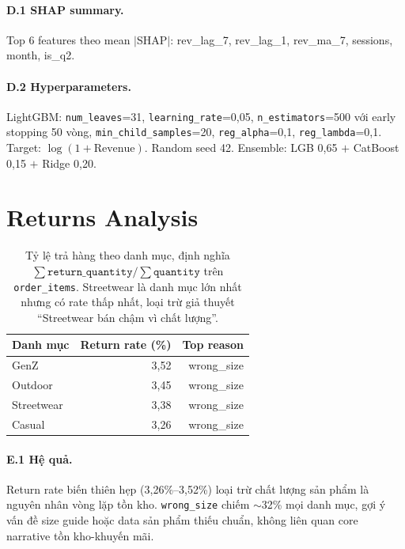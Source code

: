 \documentclass{article}
\begin{document}
\paragraph{D.1 SHAP summary.}
Top 6 features theo mean $|$SHAP$|$: rev\_lag\_7, rev\_lag\_1, rev\_ma\_7,
sessions, month, is\_q2.

\paragraph{D.2 Hyperparameters.}
LightGBM: \texttt{num\_leaves}=31, \texttt{learning\_rate}=0,05,
\texttt{n\_estimators}=500 với early stopping 50 vòng,
\texttt{min\_child\_samples}=20, \texttt{reg\_alpha}=0,1,
\texttt{reg\_lambda}=0,1. Target: $\log(1+\text{Revenue})$. Random seed
42. Ensemble: LGB 0,65 $+$ CatBoost 0,15 $+$ Ridge 0,20.

\section{Returns Analysis}
\label{app:returns}

\begin{table}[ht]
\centering
\caption{Tỷ lệ trả hàng theo danh mục, định nghĩa
$\sum\texttt{return\_quantity} / \sum\texttt{quantity}$ trên
\texttt{order\_items}. Streetwear là danh mục lớn nhất nhưng có rate
thấp nhất, loại trừ giả thuyết ``Streetwear bán chậm vì chất lượng''.}
\label{tab:return_rate}
\footnotesize
\begin{tabular}{lrr}
\toprule
Danh mục & Return rate (\%) & Top reason \\
\midrule
GenZ       & 3,52 & wrong\_size \\
Outdoor    & 3,45 & wrong\_size \\
Streetwear & 3,38 & wrong\_size \\
Casual     & 3,26 & wrong\_size \\
\bottomrule
\end{tabular}
\end{table}

\paragraph{E.1 Hệ quả.}
Return rate biến thiên hẹp (3,26\%--3,52\%) loại trừ chất lượng sản
phẩm là nguyên nhân vòng lặp tồn kho. \texttt{wrong\_size} chiếm $\sim$32\%
mọi danh mục, gợi ý vấn đề size guide hoặc data sản phẩm thiếu chuẩn,
không liên quan core narrative tồn kho-khuyến mãi.
\end{document}

